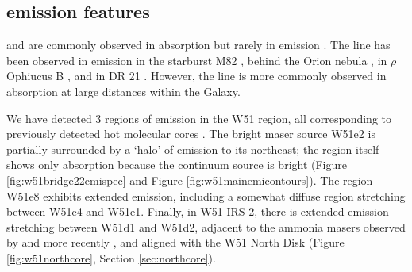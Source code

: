 

\subsection{\formaldehyde emission features}



\formaldehyde \oneone and \twotwo are commonly observed in absorption
but rarely in emission \citep[e.g.][]{Mangum1993a,Araya2007b}.  The \twotwo
line has been observed in emission in the starburst M82 \citep{Mangum2008a},
behind the Orion nebula
\citep{Evans1975a,Kutner1976a,Batrla1983a,Johnston1983a,Bastien1985a,Wilson1989a},
in $\rho$ Ophiucus B
\citep{Loren1980a,Loren1983a,Martin-Pintado1983a,Wadiak1985a}, and in DR 21
\citep{Wilson1982a,Johnston1984a}.  However, the \twotwo line is more commonly
observed in absorption at large distances within the Galaxy.

We have detected 3 regions of \twotwo emission in the W51 region, all
corresponding to previously detected hot molecular cores
\citep{Zhang1997a,Shi2010a,Shi2010b,Goddi2015a}.  The bright
maser source W51e2 is partially surrounded by a `halo' of \formaldehyde \twotwo
emission to its northeast; the \hchii region itself shows only \twotwo
absorption because the continuum source is bright
(Figure \ref{fig:w51bridge22emispec} and Figure \ref{fig:w51mainemicontours}).
The \hchii region W51e8 exhibits extended \twotwo emission, including a
somewhat diffuse region stretching between W51e4 and W51e1.  Finally, in W51
IRS 2, there is extended \twotwo
emission stretching between W51d1 and W51d2, adjacent to the ammonia masers
observed by \citet{Zhang1995a} and more recently \citet{Goddi2015a}, and
aligned with the \citet{Zapata2010a} W51 North Disk (Figure
\ref{fig:w51northcore}, Section \ref{sec:northcore}).

